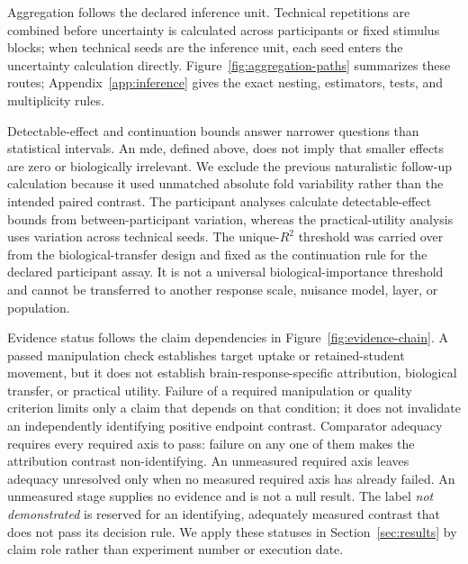 Aggregation follows the declared inference unit.
Technical repetitions are combined before uncertainty is calculated across participants or fixed stimulus blocks; when technical seeds are the inference unit, each seed enters the uncertainty calculation directly.
Figure~\ref{fig:aggregation-paths} summarizes these routes; Appendix~\ref{app:inference} gives the exact nesting, estimators, tests, and multiplicity rules.

 Detectable-effect and continuation bounds answer narrower questions than statistical intervals.
An \ac{mde}, defined above, does not imply that smaller effects are zero or biologically irrelevant.
We exclude the previous naturalistic follow-up calculation because it used unmatched absolute fold variability rather than the intended paired contrast.
The participant analyses calculate detectable-effect bounds from between-participant variation, whereas the practical-utility analysis uses variation across technical seeds.
The  unique-\(R^2\) threshold was carried over from the biological-transfer design and fixed as the continuation rule for the declared participant assay.
It is not a universal biological-importance threshold and cannot be transferred to another response scale, nuisance model, layer, or population.

Evidence status follows the claim dependencies in Figure~\ref{fig:evidence-chain}.
A passed manipulation check establishes target uptake or retained-student movement, but it does not establish brain-response-specific attribution, biological transfer, or practical utility.
Failure of a required manipulation or quality criterion limits only a claim that depends on that condition; it does not invalidate an independently identifying positive endpoint contrast.
Comparator adequacy requires every required axis to pass: failure on any one of them makes the attribution contrast non-identifying.
An unmeasured required axis leaves adequacy unresolved only when no measured required axis has already failed.
An unmeasured stage supplies no evidence and is not a null result.
The label \emph{not demonstrated} is reserved for an identifying, adequately measured contrast that does not pass its decision rule.
We apply these statuses in Section~\ref{sec:results} by claim role rather than experiment number or execution date.
